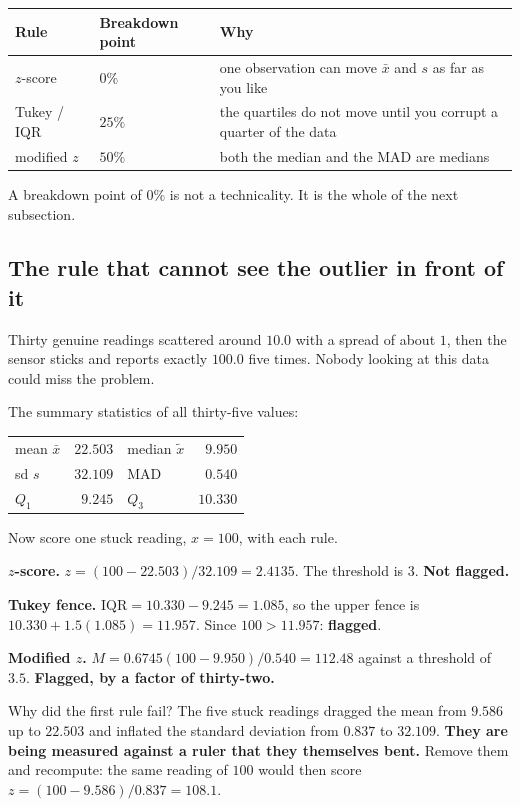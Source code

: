 \documentclass[11pt]{article}
\begin{document}
\begin{center}
\begin{tabular}{@{}llp{5.6cm}@{}}
\toprule
\textbf{Rule} & \textbf{Breakdown point} & \textbf{Why}\\
\midrule
$z$-score    & $0\%$  & one observation can move $\bar x$ and $s$ as far as
                        you like\\
Tukey / IQR  & $25\%$ & the quartiles do not move until you corrupt a quarter
                        of the data\\
modified $z$ & $50\%$ & both the median and the MAD are medians\\
\bottomrule
\end{tabular}
\end{center}

A breakdown point of $0\%$ is not a technicality. It is the whole of the next
subsection.

\subsection{The rule that cannot see the outlier in front of it}
\label{sec:masking}

\begin{worked}
Thirty genuine readings scattered around $10.0$ with a spread of about $1$,
then the sensor sticks and reports exactly $100.0$ five times. Nobody looking
at this data could miss the problem.

The summary statistics of all thirty-five values:
\begin{center}
\begin{tabular}{@{}lrlr@{}}
\toprule
mean $\bar x$ & $22.503$ & median $\tilde x$ & $9.950$\\
sd $s$        & $32.109$ & MAD               & $0.540$\\
$Q_1$         & $9.245$  & $Q_3$             & $10.330$\\
\bottomrule
\end{tabular}
\end{center}

Now score one stuck reading, $x = 100$, with each rule.

\medskip
\textbf{$z$-score.} $z = (100 - 22.503)/32.109 = 2.4135$. The threshold is $3$.
\textbf{Not flagged.}

\textbf{Tukey fence.} $\mathrm{IQR} = 10.330 - 9.245 = 1.085$, so the upper
fence is $10.330 + 1.5(1.085) = 11.957$. Since $100 > 11.957$: \textbf{flagged}.

\textbf{Modified $z$.} $M = 0.6745(100 - 9.950)/0.540 = 112.48$ against a
threshold of $3.5$. \textbf{Flagged, by a factor of thirty-two.}

\medskip
Why did the first rule fail? The five stuck readings dragged the mean from
$9.586$ up to $22.503$ and inflated the standard deviation from $0.837$ to
$32.109$. \textbf{They are being measured against a ruler that they themselves
bent.} Remove them and recompute: the same reading of $100$ would then score
$z = (100 - 9.586)/0.837 = 108.1$.
\end{worked}
\end{document}
